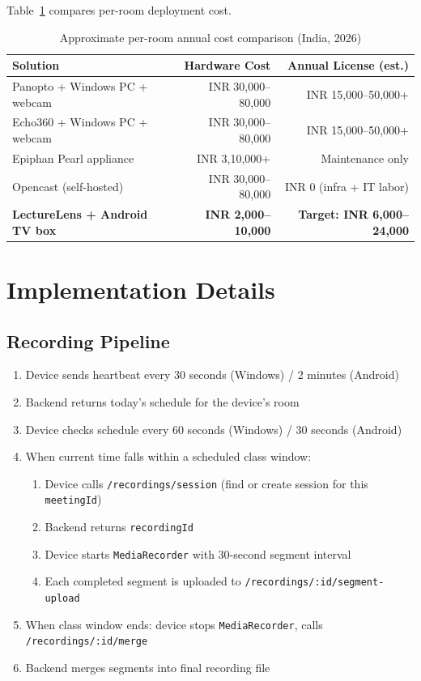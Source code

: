 \documentclass[12pt,a4paper]{article}
\begin{document}
\bigskip
Table~\ref{tab:cost} compares per-room deployment cost.

\begin{table}[H]
\centering
\caption{Approximate per-room annual cost comparison (India, 2026)}
\label{tab:cost}
\begin{tabular}{lrr}
\toprule
\textbf{Solution} & \textbf{Hardware Cost} & \textbf{Annual License (est.)} \\
\midrule
Panopto + Windows PC + webcam & INR 30{,}000--80{,}000 & INR 15{,}000--50{,}000+ \\
Echo360 + Windows PC + webcam & INR 30{,}000--80{,}000 & INR 15{,}000--50{,}000+ \\
Epiphan Pearl appliance       & INR 3{,}10{,}000+       & Maintenance only \\
Opencast (self-hosted)        & INR 30{,}000--80{,}000 & INR 0 (infra + IT labor) \\
\textbf{LectureLens + Android TV box} & \textbf{INR 2{,}000--10{,}000} & \textbf{Target: INR 6{,}000--24{,}000} \\
\bottomrule
\end{tabular}
\end{table}

\section{Implementation Details}

\subsection{Recording Pipeline}

\begin{enumerate}
    \item Device sends heartbeat every 30 seconds (Windows) / 2 minutes (Android)
    \item Backend returns today's schedule for the device's room
    \item Device checks schedule every 60 seconds (Windows) / 30 seconds (Android)
    \item When current time falls within a scheduled class window:
    \begin{enumerate}
        \item Device calls \texttt{/recordings/session} (find or create session for this \texttt{meetingId})
        \item Backend returns \texttt{recordingId}
        \item Device starts \texttt{MediaRecorder} with 30-second segment interval
        \item Each completed segment is uploaded to \texttt{/recordings/:id/segment-upload}
    \end{enumerate}
    \item When class window ends: device stops \texttt{MediaRecorder}, calls \texttt{/recordings/:id/merge}
    \item Backend merges segments into final recording file
\end{enumerate}
\end{document}
